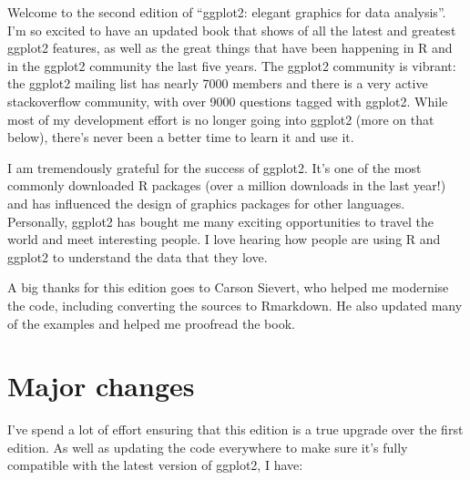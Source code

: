 \preface

Welcome to the second edition of ``ggplot2: elegant graphics for data
analysis''. I'm so excited to have an updated book that shows of all the
latest and greatest ggplot2 features, as well as the great things that
have been happening in R and in the ggplot2 community the last five
years. The ggplot2 community is vibrant: the ggplot2 mailing list has
nearly 7000 members and there is a very active stackoverflow community,
with over 9000 questions tagged with ggplot2. While most of my
development effort is no longer going into ggplot2 (more on that below),
there's never been a better time to learn it and use it.

I am tremendously grateful for the success of ggplot2. It's one of the
most commonly downloaded R packages (over a million downloads in the
last year!) and has influenced the design of graphics packages for other
languages. Personally, ggplot2 has bought me many exciting opportunities
to travel the world and meet interesting people. I love hearing how
people are using R and ggplot2 to understand the data that they love.

A big thanks for this edition goes to Carson Sievert, who helped me
modernise the code, including converting the sources to Rmarkdown. He
also updated many of the examples and helped me proofread the book.

\section*{Major changes}

I've spend a lot of effort ensuring that this edition is a true upgrade
over the first edition. As well as updating the code everywhere to make
sure it's fully compatible with the latest version of ggplot2, I have:


